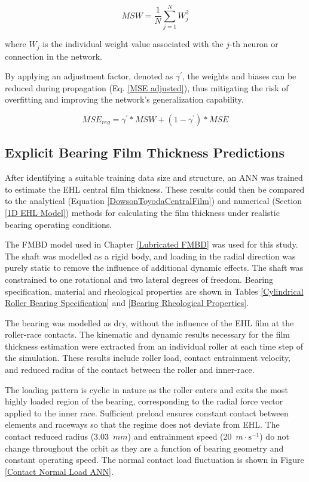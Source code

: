 \begin{equation}\label{MSW}
	M S W=\frac{1}{N} \sum_{j=1}^N W_j^2
\end{equation}

where $W_j$ is the individual weight value associated with the $j$-th neuron or connection in the network.

By applying an adjustment factor, denoted as $\gamma^{\prime}$, the weights and biases can be reduced during propagation (Eq. \ref{MSE adjusted}), thus mitigating the risk of overfitting and improving the network's generalization capability.

\begin{equation}\label{MSE adjusted}
	M S E_{r e g}=\gamma^{\prime} * M S W+\left(1-\gamma^{\prime}\right) * M S E
\end{equation}

\subsection{Explicit Bearing Film Thickness Predictions} \label{Explicit Bearing Film Thickness Predictions}
After identifying a suitable training data size and structure, an ANN was trained to estimate the EHL central film thickness. These results could then be compared to the analytical (Equation \ref{DowsonToyodaCentralFilm}) and numerical (Section \ref{1D EHL Model}) methods for calculating the film thickness under realistic bearing operating conditions.

The FMBD model used in Chapter \ref{Lubricated FMBD} was used for this study. The shaft was modelled as a rigid body, and loading in the radial direction was purely static to remove the influence of additional dynamic effects. The shaft was constrained to one rotational and two lateral degrees of freedom. Bearing specification, material and rheological properties are shown in Tables \ref{Cylindrical Roller Bearing Specification} and \ref{Bearing Rheological Properties}.

The bearing was modelled as dry, without the influence of the EHL film at the roller-race contacts. The kinematic and dynamic results necessary for the film thickness estimation were extracted from an individual roller at each time step of the simulation. These results include roller load, contact entrainment velocity, and reduced radius of the contact between the roller and inner-race.

The loading pattern is cyclic in nature as the roller enters and exits the most highly loaded region of the bearing, corresponding to the radial force vector applied to the inner race. Sufficient preload ensures constant contact between elements and raceways so that the regime does not deviate from EHL. The contact reduced radius (3.03~$mm$) and entrainment speed (20~$m \cdot \mathrm{s}^{-1}$) do not change throughout the orbit as they are a function of bearing geometry and constant operating speed. The normal contact load fluctuation is shown in Figure \ref{Contact Normal Load ANN}.

